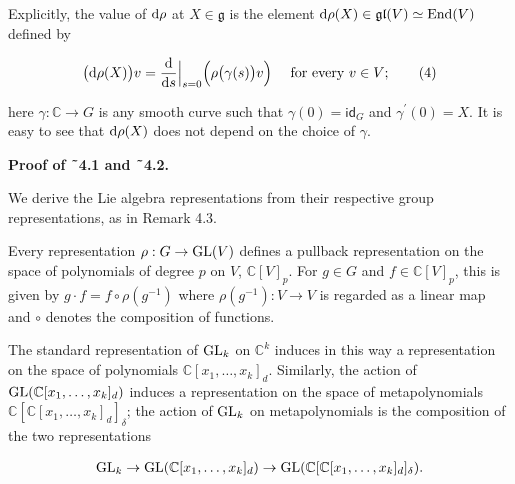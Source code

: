 Explicitly, the value of $\textnormal{d}\rho$ at $X\in\mathfrak{g}$ is the element $\textnormal{d}\rho(X)\in\mathfrak{gl}(V)\simeq\textnormal{End}(V)$ defined by



\[\begin{aligned}
\big{(}\textnormal{d}\rho(X)\big{)}v=\frac{\textnormal{d}}{\textnormal{d}s}\Big{|}_{s=0}\Big{(}\rho\big{(}\gamma(s)\big{)}v\Big{)}\quad\text{ for every $v\in V$};\qquad\text{(4)}
\end{aligned}\]


here $\gamma:\mathbb{C}\to G$ is any smooth curve such that $\gamma(0)=\mathsf{id}_{G}$ and $\gamma^{\prime}(0)=X$. It is easy to see that $\textnormal{d}\rho(X)$ does not depend on the choice of $\gamma$.






\par\medskip\noindent\textbf{Proof of ˜4.1 and ˜4.2.}\par




We derive the Lie algebra representations from their respective group representations, as in Remark 4.3.





Every representation $\rho:G\to\textnormal{GL}(V)$ defines a pullback representation on the space of polynomials of degree $p$ on $V$, $\mathbb{C}[V]_{p}$. For $g\in G$ and $f\in\mathbb{C}[V]_{p}$, this is given by $g\cdot f=f\circ\rho(g^{-1})$ where $\rho(g^{-1}):V\to V$ is regarded as a linear map and $\circ$ denotes the composition of functions.





The standard representation of $\textnormal{GL}_{k}$ on $\mathbb{C}^{k}$ induces in this way a representation on the space of polynomials $\mathbb{C}[x_{1},\ldots,x_{k}]_{d}$. Similarly, the action of $\textnormal{GL}(\mathbb{C}[x_{1},\ldots,x_{k}]_{d})$ induces a representation on the space of metapolynomials $\mathbb{C}[\mathbb{C}[x_{1},\ldots,x_{k}]_{d}]_{\delta}$; the action of $\textnormal{GL}_{k}$ on metapolynomials is the composition of the two representations



\[\begin{aligned}
\textnormal{GL}_{k}\to\textnormal{GL}(\mathbb{C}[x_{1},\ldots,x_{k}]_{d})\to\textnormal{GL}(\mathbb{C}[\mathbb{C}[x_{1},\ldots,x_{k}]_{d}]_{\delta}).
\end{aligned}\]


